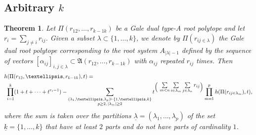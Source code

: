 \documentclass[11pt]{article}
\newtheorem{theorem}[theo]{Theorem}
\theoremstyle{definition}
\numberwithin{equation}{section}
\newcommand{\A}{\mathfrak{A}}
\begin{document}
\subsection{Arbitrary \texorpdfstring{$k$}{k}}
\begin{theorem}\label{main:h-poly} 
Let $\Pi(r_{12}, \ldots ,r_{k-1 k})$ be a Gale dual type-A root polytope and let $r_i=\sum_{j\neq i}r_{ij}$. Given a subset $\lambda\subset\{1, \ldots ,k\}$, we denote by $\Pi({r}_{ij\in\lambda})$ the Gale dual  root polytope corresponding to the root system $A_{|\lambda|-1}$ defined by  the sequence of vectors $[\alpha_{ij}]_{i,j\in\lambda} \subset \A(r_{12}, \ldots ,r_{k-1 k})$ with $\alpha_{ij}$ repeated $r_{ij}$ times. Then 
\begin{align*}
&h(\Pi(r_{12}, \ldots ,r_{k-1 k}),t) = \\
&\ \prod_{i=1}^k (1+t+ \cdots +t^{r_i-1}) - 
 \sum_{\substack{(\lambda_1, \ldots ,\lambda_p)\vdash\{1, \ldots ,k\} \\ p\geq 2, \, |\lambda_m|\geq 2}}t^{\Big( \vcenter{\hbox{ $\sum\limits_{m<n}\sum\limits_{i\in \lambda_m}\sum\limits_{j\in \lambda_n}r_{ij}$}} \Big)}\prod_{m=1}^ph(\Pi({r}_{ij\in\lambda_m}),t),
\end{align*}
where the sum is taken over the partitions $\underline{\lambda}=(\lambda_1, \ldots ,\lambda_p)$ of the set $\underline{k}=\{1, \ldots ,k\}$ that have at least $2$ parts and do not have parts of cardinality $1$.
\end{theorem}
\end{document}
